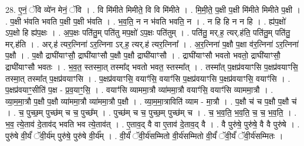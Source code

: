 \documentclass[17pt]{extarticle}
\begin{document}
28. ए॒नं॒ ॅवि व्ये॑न मेनं॒ ॅवि । . वि मि॑मीते मिमीते॒ वि वि मि॑मीते । . मि॒मी॒ते॒ प॒क्षी प॒क्षी मि॑मीते मिमीते प॒क्षी । . प॒क्षी भ॑वति भवति प॒क्षी प॒क्षी भ॑वति । . भ॒व॒ति॒ न न भ॑वति भवति॒ न । . न हि हि न न हि । . ह्य॑प॒क्षो॑ ऽप॒क्षो हि ह्य॑प॒क्षः । . अ॒प॒क्षः पति॑तु॒म् पति॑तु मप॒क्षो॑ ऽप॒क्षः पति॑तुम् । . पति॑तु॒ मर्.ह॒ त्यर्.ह॑ति॒ पति॑तु॒म् पति॑तु॒ मर्.ह॑ति । . अर्.ह॑ त्यर॒त्निना॑ ऽर॒त्निना ऽर्.ह॒ त्यर्.ह॑ त्यर॒त्निना᳚ । . अ॒र॒त्निना॑ प॒क्षौ प॒क्षा व॑र॒त्निना॑ ऽर॒त्निना॑ प॒क्षौ । . प॒क्षौ द्राघी॑याꣳसौ॒ द्राघी॑याꣳसौ प॒क्षौ प॒क्षौ द्राघी॑याꣳसौ । . द्राघी॑याꣳसौ भवतो भवतो॒ द्राघी॑याꣳसौ॒ द्राघी॑याꣳसौ भवतः । . भ॒व॒त॒ स्तस्मा॒त् तस्मा᳚द् भवतो भवत॒ स्तस्मा᳚त् । . तस्मा᳚त् प॒क्षप्र॑वयाꣳसि प॒क्षप्र॑वयाꣳसि॒ तस्मा॒त् तस्मा᳚त् प॒क्षप्र॑वयाꣳसि । . प॒क्षप्र॑वयाꣳसि॒ वयाꣳ॑सि॒ वयाꣳ॑सि प॒क्षप्र॑वयाꣳसि प॒क्षप्र॑वयाꣳसि॒ वयाꣳ॑सि । . प॒क्षप्र॑वयाꣳ॒॒सीति॑ प॒क्ष - प्र॒व॒याꣳ॒॒सि॒ । . वयाꣳ॑सि व्याममा॒त्रौ व्या॑ममा॒त्रौ वयाꣳ॑सि॒ वयाꣳ॑सि व्याममा॒त्रौ । . व्या॒म॒मा॒त्रौ प॒क्षौ प॒क्षौ व्या॑ममा॒त्रौ व्या॑ममा॒त्रौ प॒क्षौ । . व्या॒म॒मा॒त्राविति॑ व्याम - मा॒त्रौ । . प॒क्षौ च॑ च प॒क्षौ प॒क्षौ च॑ । . च॒ पुच्छ॒म् पुच्छ॑म् च च॒ पुच्छ᳚म् । . पुच्छ॑म् च च॒ पुच्छ॒म् पुच्छ॑म् च । . च॒ भ॒व॒ति॒ भ॒व॒ति॒ च॒ च॒ भ॒व॒ति॒ । . भ॒व॒ त्ये॒ताव॑ दे॒ताव॑द् भवति भव त्ये॒ताव॑त् । . ए॒ताव॒द् वै वा ए॒ताव॑ दे॒ताव॒द् वै । . वै पुरु॑षे॒ पुरु॑षे॒ वै वै पुरु॑षे । . पुरु॑षे वी॒र्यं॑ ॅवी॒र्य॑म् पुरु॑षे॒ पुरु॑षे वी॒र्य᳚म् । . वी॒र्यं॑ ॅवी॒र्य॑सम्मितो वी॒र्य॑सम्मितो वी॒र्यं॑ ॅवी॒र्यं॑ ॅवी॒र्य॑सम्मितः । \newline
\end{document}
